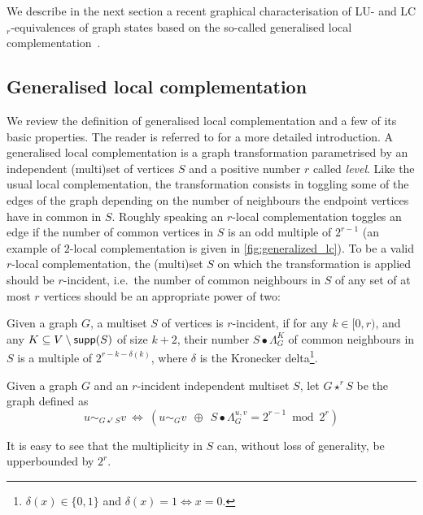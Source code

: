 \documentclass[a4paper,UKenglish,cleveref,autoref,thm-restate]{arxiv}
\newcommand{\supp}{\textup{\textsf{supp}}}
\begin{document}
We describe in the next section a recent graphical characterisation of LU- and LC$_r$-equivalences of graph states based on the so-called generalised local complementation~\cite{claudet2024local}. 

\subsection{Generalised local complementation}


We review the definition of generalised local complementation and a few of its basic properties. The reader is referred to \cite{claudet2024local} for a more detailed introduction. A generalised local complementation is a graph transformation parametrised by an independent (multi)set of vertices $S$ and a positive number $r$ called \emph{level}. Like the usual local complementation, the transformation consists in toggling some of the edges of the graph depending on the number of neighbours the endpoint vertices have in common in $S$. Roughly speaking an $r$-local complementation toggles an edge if the number of common vertices in $S$ is an odd multiple of $2^{r-1}$ (an example of $2$-local complementation is given in \cref{fig:generalized_lc}). To be a valid $r$-local complementation, the (multi)set $S$ on which the transformation is applied should  be $r$-incident, i.e.~the number of common neighbours in $S$ of any set of at most $r$ vertices should be an appropriate power of two: 

\begin{definition}[$r$-Incidence]\label{def:r-inc}
    Given a graph $G$, a multiset $S$ of vertices is  $r$-incident, if for any $k\in [0,r)$, and any $K\subseteq V\setminus \supp(S)$ of size $k+2$, their number $S\bullet \Lambda_G^K$ of common neighbours in $S$ is a multiple of $2^{r-k-\delta(k)}$,
    where $\delta$ is the Kronecker delta\footnote{$\delta(x)\in \{0,1\}$ and $\delta(x)=1 \Leftrightarrow x=0$.
    }.
\end{definition}
 
\begin{definition}\label{def:r-LC}
    Given a graph $G$ and an $r$-incident independent multiset $S$, let $G\star^rS$ be the graph defined as
    $$u\sim_{G\star^r S} v ~\Leftrightarrow~\left(u\sim_{G} v ~~\oplus~~ S \bullet\Lambda_G^{u,v} = 2^{r-1}\bmod 2^{r}\right)$$
\end{definition}

It is easy to see that the multiplicity in $S$ can, without loss of generality, be upperbounded by $2^r$. 
\end{document}
